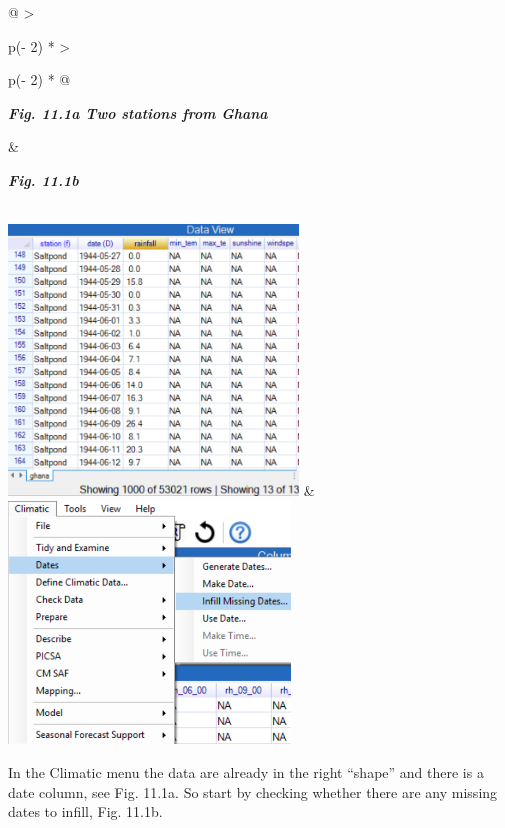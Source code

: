\documentclass[
  letterpaper,
  DIV=11,
  numbers=noendperiod]{scrreprt}
\begin{document}
\begin{longtable}[]{@{}
  >{\raggedright\arraybackslash}p{(\columnwidth - 2\tabcolsep) * }
  >{\raggedright\arraybackslash}p{(\columnwidth - 2\tabcolsep) * }@{}}
\toprule\noalign{}
\begin{minipage}[b]{\linewidth}\raggedright
\textbf{\emph{Fig. 11.1a Two stations from Ghana}}
\end{minipage} & \begin{minipage}[b]{\linewidth}\raggedright
\textbf{\emph{Fig. 11.1b}}
\end{minipage} \\
\midrule\noalign{}
\endhead
\bottomrule\noalign{}
\endlastfoot
\includegraphics[width=3.03243in,height=2.83534in]{figures/Fig11.1a.png}
&
\includegraphics[width=2.95096in,height=2.53564in]{figures/Fig11.1b.png} \\
\end{longtable}

In the Climatic menu the data are already in the right ``shape'' and
there is a date column, see Fig. 11.1a. So start by checking whether
there are any missing dates to infill, Fig. 11.1b.
\end{document}

